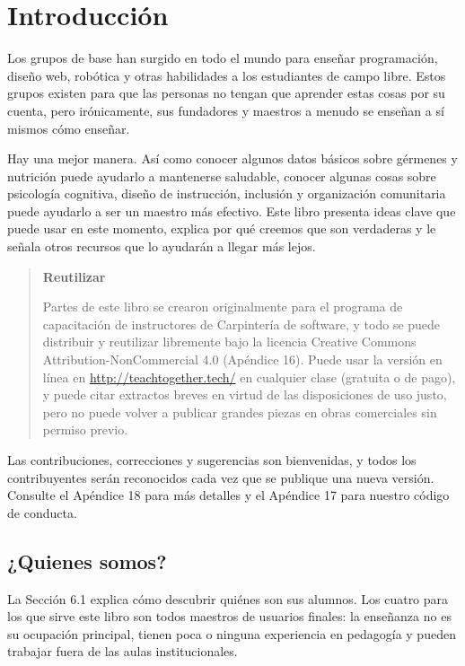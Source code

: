 \documentclass[
]{book}
\begin{document}
\hypertarget{introducciuxf3n}{%
\chapter{Introducción}\label{introducciuxf3n}}

Los grupos de base han surgido en todo el mundo para enseñar programación, diseño web, robótica y otras habilidades a los estudiantes de campo libre. Estos grupos existen para que las personas no tengan que aprender estas cosas por su cuenta, pero irónicamente, sus fundadores y maestros a menudo se enseñan a sí mismos cómo enseñar.

Hay una mejor manera. Así como conocer algunos datos básicos sobre gérmenes y nutrición puede ayudarlo a mantenerse saludable, conocer algunas cosas sobre psicología cognitiva, diseño de instrucción, inclusión y organización comunitaria puede ayudarlo a ser un maestro más efectivo. Este libro presenta ideas clave que puede usar en este momento, explica por qué creemos que son verdaderas y le señala otros recursos que lo ayudarán a llegar más lejos.

\begin{quote}
\textbf{Reutilizar}

Partes de este libro se crearon originalmente para el programa de capacitación de instructores de Carpintería de software, y todo se puede distribuir y reutilizar libremente bajo la licencia Creative Commons Attribution-NonCommercial 4.0 (Apéndice 16). Puede usar la versión en línea en \url{http://teachtogether.tech/} en cualquier clase (gratuita o de pago), y puede citar extractos breves en virtud de las disposiciones de uso justo, pero no puede volver a publicar grandes piezas en obras comerciales sin permiso previo.
\end{quote}

Las contribuciones, correcciones y sugerencias son bienvenidas, y todos los contribuyentes serán reconocidos cada vez que se publique una nueva versión. Consulte el Apéndice 18 para más detalles y el Apéndice 17 para nuestro código de conducta.

\hypertarget{quienes-somos}{%
\section{¿Quienes somos?}\label{quienes-somos}}

La Sección 6.1 explica cómo descubrir quiénes son sus alumnos. Los cuatro para los que sirve este libro son todos maestros de usuarios finales: la enseñanza no es su ocupación principal, tienen poca o ninguna experiencia en pedagogía y pueden trabajar fuera de las aulas institucionales.
\end{document}
